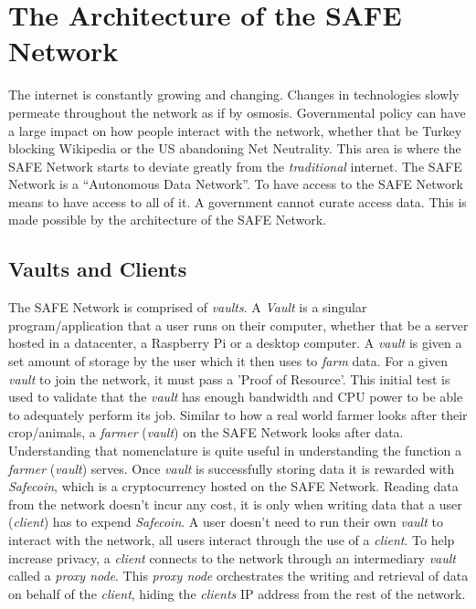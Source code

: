 \chapter{The Architecture of the SAFE Network}
\label{ch:architecture}

The internet is constantly growing and changing. Changes in technologies slowly permeate throughout the network as if by osmosis. Governmental policy can have a large impact on how people interact with the network, whether that be Turkey blocking Wikipedia\cite{turkey} or the US abandoning Net Neutrality. This area is where the SAFE Network starts to deviate greatly from the \textit{traditional} internet. The SAFE Network is a ``Autonomous Data Network''. To have access to the SAFE Network means to have access to all of it. A government cannot curate access data. This is made possible by the architecture of the SAFE Network.

\section{Vaults and Clients}

The SAFE Network is comprised of \textit{vaults}. A \textit{Vault} is a singular program/application that a user runs on their computer, whether that be a server hosted in a datacenter, a Raspberry Pi or a desktop computer. A \textit{vault} is given a set amount of storage by the user which it then uses to \textit{farm} data. For a given \textit{vault} to join the network, it must pass a 'Proof of Resource'. This initial test is used to validate that the \textit{vault} has enough bandwidth and CPU power to be able to adequately perform its job. Similar to how a real world farmer looks after their crop/animals, a \textit{farmer} (\textit{vault}) on the SAFE Network looks after data. Understanding that nomenclature is quite useful in understanding the function a \textit{farmer} (\textit{vault}) serves. Once \textit{vault} is successfully storing data it is rewarded with \textit{Safecoin}, which is a cryptocurrency hosted on the SAFE Network. Reading data from the network doesn't incur any cost, it is only when writing data that a user (\textit{client}) has to expend \textit{Safecoin}. A user doesn't need to run their own \textit{vault} to interact with the network, all users interact through the use of a \textit{client}. To help increase privacy, a \textit{client} connects to the network through an intermediary \textit{vault} called a \textit{proxy node}. This \textit{proxy node} orchestrates the writing and retrieval of data on behalf of the \textit{client}, hiding the \textit{clients} IP address from the rest of the network.

